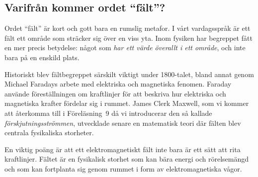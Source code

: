 \subsection{Varifr{\aa}n kommer ordet ``f{\"a}lt''?}
Ordet ``f{\"a}lt'' {\"a}r kort och gott bara en rumslig metafor. I v{\aa}rt
vardagsspr{\aa}k {\"a}r ett f{\"a}lt ett omr{\aa}de som str{\"a}cker sig
{\"o}ver en viss yta. Inom fysiken har begreppet f{\aa}tt en mer precis
betydelse: n{\aa}got som {\it har ett v{\"a}rde {\"o}verallt i ett omr{\aa}de},
och inte bara p{\aa} en enskild plats.

Historiskt blev f{\"a}ltbegreppet s{\"a}rskilt viktigt under 1800-talet, bland
annat genom Michael Faradays 
arbete med elektriska och magnetiska fenomen. Faraday anv{\"a}nde
f{\"o}rest{\"a}llningen om kraftlinjer f{\"o}r att beskriva hur elektriska
och magnetiska krafter f{\"o}rdelar sig i rummet.
James Clerk Maxwell, som vi kommer att
{\aa}terkomma till i F{\"o}rel{\"a}sning~9 d{\aa} vi introducerar den s{\aa}
kallade {\it f{\"o}rskjutningsstr{\"o}mmen}, utvecklade senare en matematisk
teori d{\"a}r f{\"a}lten blev centrala fysikaliska storheter.

En viktig po{\"a}ng {\"a}r att ett elektromagnetiskt f{\"a}lt inte bara {\"a}r
ett s{\"a}tt att rita kraftlinjer. F{\"a}ltet {\"a}r en fysikalisk storhet som
kan b{\"a}ra energi och r{\"o}relsem{\"a}ngd och som kan fortplanta sig genom
rummet i form av elektromagnetiska v{\aa}gor.

